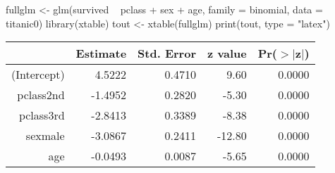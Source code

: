 \begin{Schunk}
\begin{Sinput}
 fullglm <- glm(survived ~ pclass + sex + age, family = binomial, data = titanic0)
 library(xtable)
 tout <- xtable(fullglm)
 print(tout, type = "latex")
\end{Sinput}
% latex table generated in R 3.0.1 by xtable 1.7-1 package
% Mon Jun 10 08:30:38 2013
\begin{table}[ht]
\centering
\begin{tabular}{rrrrr}
  \hline
 & Estimate & Std. Error & z value & Pr($>$$|$z$|$) \\ 
  \hline
(Intercept) & 4.5222 & 0.4710 & 9.60 & 0.0000 \\ 
  pclass2nd & -1.4952 & 0.2820 & -5.30 & 0.0000 \\ 
  pclass3rd & -2.8413 & 0.3389 & -8.38 & 0.0000 \\ 
  sexmale & -3.0867 & 0.2411 & -12.80 & 0.0000 \\ 
  age & -0.0493 & 0.0087 & -5.65 & 0.0000 \\ 
   \hline
\end{tabular}
\end{table}\end{Schunk}
